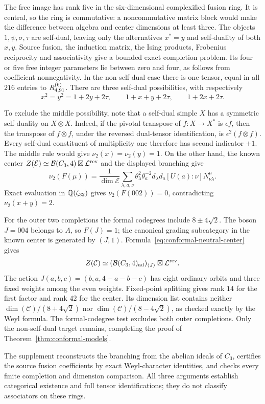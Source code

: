 The free image has rank five in the six-dimensional complexified fusion
ring. It is central, so the ring is commutative: a noncommutative matrix
block would make the difference between algebra and center dimensions
at least three. The objects $1,\psi,\sigma,\tau$ are self-dual, leaving
only the alternatives $x^*=y$ and self-duality of both $x,y$.
Source fusion, the induction matrix, the Ising products, Frobenius
reciprocity and associativity give a bounded exact completion problem.
Its four or five free integer parameters lie between zero and four,
as follows from coefficient nonnegativity. In the non-self-dual case
there is one tensor, equal in all $216$ entries to $R^{(6)}_{4,91}$.
There are three self-dual possibilities, with respectively
\[
 x^2=y^2=1+2y+2\tau,\qquad
 1+x+y+2\tau,\qquad
 1+2x+2\tau.
\]

To exclude the middle possibility, note that a self-dual simple $X$
has a symmetric self-duality on $X\otimes X$. Indeed, if the pivotal
transpose of $f:X\to X^*$ is $\epsilon f$, then the transpose of
$f\otimes f$, under the reversed dual-tensor identification, is
$\epsilon^2(f\otimes f)$. Every self-dual constituent of multiplicity
one therefore has second indicator $+1$. The middle rule would give
$\nu_2(x)=\nu_2(y)=1$.
On the other hand, the known center
$Z(\mathcal E)\simeq\mathcal B(C_3,4)\boxtimes\mathcal L^{\rm rev}$
and the displayed branching give
\[
 \nu_2(F(\mu))=
 \frac1{\dim\mathcal E}\sum_{\lambda,a,\nu}
 \theta_\lambda^2\theta_a^{-2}d_\lambda d_a
 [U(a):\nu]N_{\nu\lambda}^{\mu}.
\]
Exact evaluation in $\mathbb Q(\zeta_{32})$ gives
$\nu_2(F(002))=0$, contradicting $\nu_2(x+y)=2$.

For the outer two completions the formal codegrees include
$8\pm4\sqrt2$. The boson $J=004$ belongs to $A$, so $F(J)=1$;
the canonical grading subcategory in the known center is generated by
$(J,1)$. Formula~\eqref{eq:conformal-neutral-center} gives
\[
 Z(\mathcal C)\simeq
 (\mathcal B(C_3,4)_{\rm ad})_{\langle J\rangle}
 \boxtimes\mathcal L^{\rm rev}.
\]
The action $J(a,b,c)=(b,a,4-a-b-c)$ has eight ordinary orbits and three
fixed weights among the even weights. Fixed-point splitting gives
rank $14$ for the first factor and rank $42$ for the center.
Its dimension list contains neither
$\dim(\mathcal C)/(8+4\sqrt2)$ nor
$\dim(\mathcal C)/(8-4\sqrt2)$, as checked exactly by the Weyl formula.
The formal-codegree test excludes both outer completions. Only the
non-self-dual target remains, completing the proof of
Theorem~\ref{thm:conformal-models}.

The supplement reconstructs the branching from the abelian ideals of
$C_3$, certifies the source fusion coefficients by exact Weyl-character
identities, and checks every finite completion and dimension comparison.
All three arguments establish categorical existence and full tensor
identifications; they do not classify associators on these rings.
